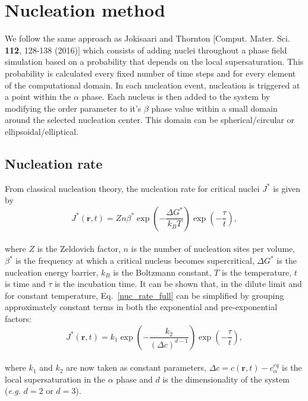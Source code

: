 \documentclass[11pt]{article}
\renewcommand{\=}[1]{\stackrel{#1}{=}} %
\theoremstyle{definition}
\theoremstyle{remark}
\begin{document}
\section{Nucleation method}

We follow the same approach as Jokisaari and Thornton [Comput. Mater. Sci. {\bf 112}, 128-138 (2016)] which consists of adding nuclei throughout a phase field simulation based on a probability that depends on the local supersaturation. This probability is calculated every fixed number of time steps and for every element of the computational domain. In each nucleation event, nucleation is triggered at a point within the $\alpha$ phase. Each nucleus is then added to the system by modifying the order parameter to it's $\beta$ phase value within a small domain around the selected nucleation center. This domain can be spherical/circular or ellipsoidal/elliptical.  

\subsection{Nucleation rate}

From classical nucleation theory, the nucleation rate for critical nuclei $J^*$ is given by
\\
\begin{equation}
\label{nuc_rate_full}
J^*(\mathbf{r},t)=Zn\beta^*\exp \left( -\frac{\Delta G^*}{k_B T} \right) \exp \left( -\frac{\tau}{t} \right),
\end{equation}
\\
where $Z$ is the Zeldovich factor, $n$ is the number of nucleation sites per volume, $\beta^*$ is the frequency at which a critical nucleus becomes supercritical, $\Delta G^*$ is the nucleation energy barrier, $k_B$ is the Boltzmann constant, $T$ is the temperature, $t$ is time and $\tau$ is the incubation time. It can be shown that, in the dilute limit and for constant temperature, Eq.~\eqref{nuc_rate_full} can be simplified by grouping approximately constant terms in both the exponential and pre-exponential factors:
\\
\begin{equation}
\label{nuc_rate_simp}
J^*(\mathbf{r},t)=k_1\exp \left( -\frac{k_2}{(\Delta c)^{d-1}} \right) \exp \left(-\frac{\tau}{t} \right),
\end{equation}
\\
where  $k_1$ and $k_2$ are now taken as constant parameters, $\Delta c=c(\mathbf{r},t)-c_\alpha^{eq}$ is the local supersaturation in the $\alpha$ phase and $d$ is the dimensionality of the system ({\it e.g.} $d=2$ or $d=3$).\\
\end{document}
